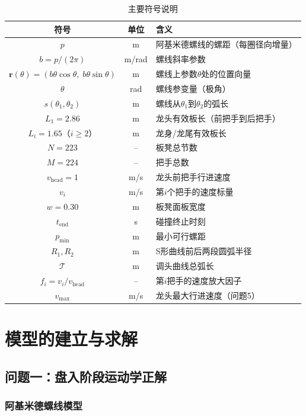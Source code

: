 \documentclass[12pt]{ctexart}
\begin{document}
\begin{table}[H]
\centering
\caption{主要符号说明}
\begin{tabular}{ccl}
\toprule
符号 & 单位 & 含义 \\
\midrule
$p$ & m & 阿基米德螺线的螺距（每圈径向增量） \\
$b = p/(2\pi)$ & m/rad & 螺线斜率参数 \\
$\bm{r}(\theta) = (b\theta\cos\theta,\;b\theta\sin\theta)$ & m & 螺线上参数$\theta$处的位置向量 \\
$\theta$ & rad & 螺线参变量（极角） \\
$s(\theta_1,\theta_2)$ & m & 螺线从$\theta_1$到$\theta_2$的弧长 \\
$L_1 = 2.86$ & m & 龙头有效板长（前把手到后把手） \\
$L_i = 1.65$（$i\ge 2$） & m & 龙身/龙尾有效板长 \\
$N=223$ & -- & 板凳总节数 \\
$M=224$ & -- & 把手总数 \\
$v_{\text{head}} = 1$ & m/s & 龙头前把手行进速度 \\
$v_i$ & m/s & 第$i$个把手的速度标量 \\
$w = 0.30$ & m & 板凳面板宽度 \\
$t_{\text{end}}$ & s & 碰撞终止时刻 \\
$p_{\min}$ & m & 最小可行螺距 \\
$R_1, R_2$ & m & S形曲线前后两段圆弧半径 \\
$\mathcal{T}$ & m & 调头曲线总弧长 \\
$f_i = v_i/v_{\text{head}}$ & -- & 第$i$把手的速度放大因子 \\
$v_{\max}$ & m/s & 龙头最大行进速度（问题5） \\
\bottomrule
\end{tabular}
\label{tab:notation}
\end{table}

\FloatBarrier

\section{模型的建立与求解}

\subsection{问题一：盘入阶段运动学正解}

\subsubsection{阿基米德螺线模型}
\end{document}
